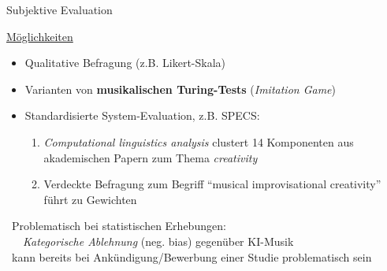 \begin{frame}{Subjektive Evaluation}
	
	\underline{Möglichkeiten}
	\begin{itemize}
		\item Qualitative Befragung (z.B. Likert-Skala)
		\item Varianten von \textbf{musikalischen Turing-Tests} (\emph{Imitation Game})
		\item Standardisierte System-Evaluation, z.B. SPECS: \citep{SPECS}\\
		\medskip
		\parbox{8cm}{
			\begin{enumerate}
				\item \emph{Computational
				linguistics analysis} clustert 14 Komponenten aus akademischen Papern zum Thema \emph{creativity}
				\smallskip
				\item Verdeckte Befragung zum Begriff \enquote{musical improvisational creativity} führt zu Gewichten
			\end{enumerate}
		}
	\end{itemize}
	
	\bigskip\medskip
	\warnSign~Problematisch bei statistischen Erhebungen:\\
	\smallskip
	~~~\emph{Kategorische Ablehnung} (neg. bias) gegenüber KI-Musik\\
	\smallskip
	\conclude~kann bereits bei Ankündigung/Bewerbung einer Studie problematisch sein
\end{frame}

